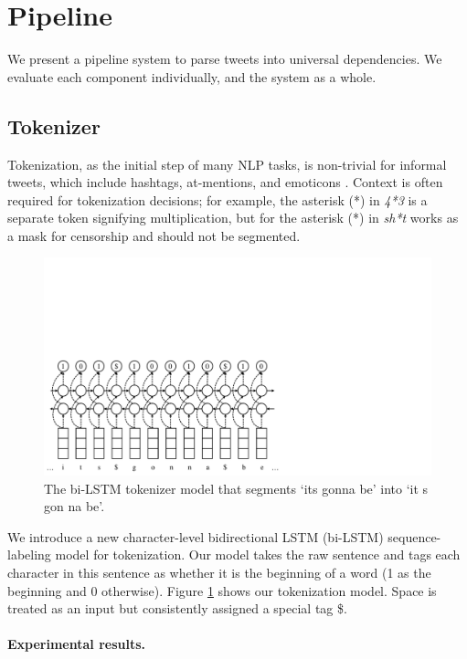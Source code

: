 \documentclass[11pt,a4paper]{article}
\begin{document}
\section{Pipeline}
\label{sec:parsing}

We present a pipeline system to parse tweets into universal
dependencies.  We evaluate each component individually, and the system
as a whole.

\subsection{Tokenizer} \label{sec:tok}
Tokenization, as the initial step of many NLP tasks, is non-trivial for
informal tweets, which include hashtags, at-mentions, and emoticons
\cite{ICWSM101540}.  Context is often required for tokenization
decisions; for example,
the asterisk (*) in {\it 4*3} is a separate token signifying
multiplication, but for the asterisk (*) in {\it sh*t}
works as a mask for censorship and should not be segmented.

\begin{figure}[t]
	\centering
	\includegraphics[width=\columnwidth,trim={0 0 13cm 9cm},clip]{graphics/bilstm_tokenizer}
	\caption{The bi-LSTM tokenizer model that segments `its gonna be' into `it s gon na be'.}\label{fig:tok-model}
\end{figure}
We introduce a new
character-level bidirectional LSTM (bi-LSTM) sequence-labeling model
\cite{DBLP:journals/corr/HuangXY15,ma-hovy:2016:P16-1}
for tokenization.
Our model takes the raw sentence and tags each character in this 
sentence as whether it is the beginning of a word (1 as the beginning and 0 otherwise).
Figure \ref{fig:tok-model} shows our tokenization model.
Space is treated as an input but consistently assigned a special tag \$.

\paragraph{Experimental results.}
\end{document}
